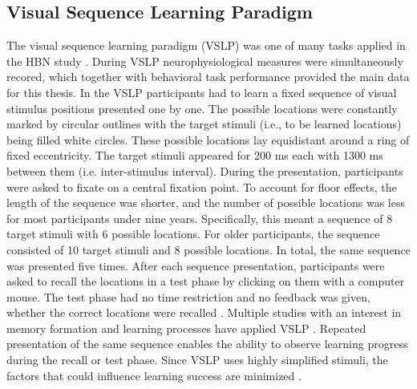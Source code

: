 \subsection{Visual Sequence Learning Paradigm} \label{VSLP}
The visual sequence learning paradigm (VSLP) \parencite{moiselloNeuralActivationsVisual2013} was one of many tasks applied in the HBN study \parencite[see][]{alexanderOpenResourceTransdiagnostic2017}. During VSLP neurophysiological measures were simultaneously recored, which together with behavioral task performance provided the main data for this thesis.   
In the VSLP participants had to learn a fixed sequence of visual stimulus positions presented one by one. The possible locations were constantly marked by circular outlines with the target stimuli (i.e., to be learned locations) being filled white circles. These possible locations lay equidistant around a ring of fixed eccentricity. The target stimuli appeared for 200 ms each with 1300 ms between them (i.e. inter-stimulus interval). During the presentation, participants were asked to fixate on a central fixation point. To account for floor effects, the length of the sequence was shorter, and the number of possible locations was less for most participants under nine years. Specifically, this meant a sequence of 8 target stimuli with 6 possible locations. For older participants, the sequence consisted of 10 target stimuli and 8 possible locations.  In total, the same sequence was presented five times. After each sequence presentation, participants were asked to recall the locations in a test phase by clicking on them with a computer mouse. The test phase had no time restriction and no feedback was given, whether the correct locations were recalled \parencite{langerResourceAssessingInformation2017}.
Multiple studies with an interest in memory formation and learning processes have applied VSLP \parencite[e.g.,][]{steinemannTrackingNeuralCorrelates2016,strzelczykNeurophysiologicalMarkersSuccessful2022}. Repeated presentation of the same sequence enables the ability to observe learning progress during the recall or test phase. Since VSLP uses highly simplified stimuli, the factors that could influence learning success are minimized \parencite{steinemannTrackingNeuralCorrelates2016}. 

